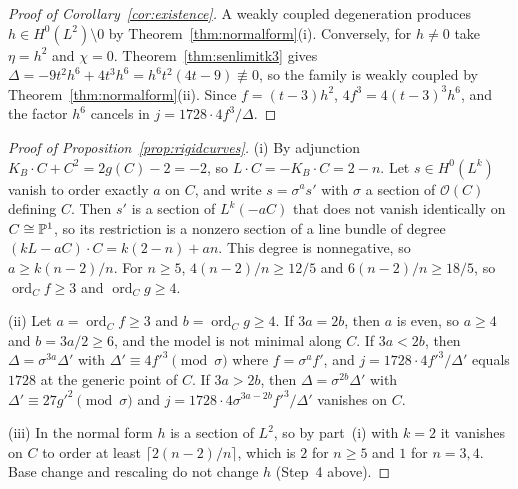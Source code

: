 \begin{proof}[Proof of Corollary~\ref{cor:existence}]
A weakly coupled degeneration produces $h\in H^0(L^2)\setminus0$ by Theorem~\ref{thm:normalform}(i). Conversely, for $h\ne0$ take $\eta=h^2$ and $\chi=0$. Theorem~\ref{thm:senlimitk3} gives $\Delta=-9t^2h^6+4t^3h^6=h^6t^2(4t-9)\not\equiv0$, so the family is weakly coupled by Theorem~\ref{thm:normalform}(ii). Since $f=(t-3)h^2$, $4f^3=4(t-3)^3h^6$, and the factor $h^6$ cancels in $j=1728\cdot4f^3/\Delta$.
\end{proof}

\begin{proof}[Proof of Proposition~\ref{prop:rigidcurves}]
(i) By adjunction $K_B\cdot C+C^2=2g(C)-2=-2$, so $L\cdot C=-K_B\cdot C=2-n$. Let $s\in H^0(L^k)$ vanish to order exactly $a$ on $C$, and write $s=\sigma^as'$ with $\sigma$ a section of $\mathcal O(C)$ defining $C$. Then $s'$ is a section of $L^k(-aC)$ that does not vanish identically on $C\cong\mathbb{P}^1$, so its restriction is a nonzero section of a line bundle of degree $(kL-aC)\cdot C=k(2-n)+an$. This degree is nonnegative, so $a\ge k(n-2)/n$. For $n\ge5$, $4(n-2)/n\ge12/5$ and $6(n-2)/n\ge18/5$, so $\operatorname{ord}_Cf\ge3$ and $\operatorname{ord}_Cg\ge4$.

(ii) Let $a=\operatorname{ord}_Cf\ge3$ and $b=\operatorname{ord}_Cg\ge4$. If $3a=2b$, then $a$ is even, so $a\ge4$ and $b=3a/2\ge6$, and the model is not minimal along $C$. If $3a<2b$, then $\Delta=\sigma^{3a}\Delta'$ with $\Delta'\equiv4f'^3\pmod\sigma$ where $f=\sigma^af'$, and $j=1728\cdot4f'^3/\Delta'$ equals $1728$ at the generic point of $C$. If $3a>2b$, then $\Delta=\sigma^{2b}\Delta'$ with $\Delta'\equiv27g'^2\pmod\sigma$ and $j=1728\cdot4\sigma^{3a-2b}f'^3/\Delta'$ vanishes on $C$.

(iii) In the normal form $h$ is a section of $L^2$, so by part~(i) with $k=2$ it vanishes on $C$ to order at least $\lceil2(n-2)/n\rceil$, which is $2$ for $n\ge5$ and $1$ for $n=3,4$. Base change and rescaling do not change $h$ (Step~4 above).
\end{proof}

